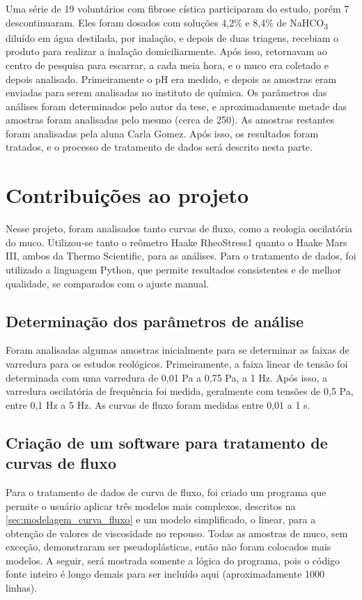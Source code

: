 	Uma série de 19 voluntários com fibrose cística participaram do estudo, porém 7 descontinuaram. Eles foram dosados com soluções 4,2\% e 8,4\% de NaHCO\textsubscript{3} diluído em água destilada, por inalação, e depois de duas triagens, recebiam o produto para realizar a inalação domiciliarmente. Após isso, retornavam ao centro de pesquisa para escarrar, a cada meia hora, e o muco era coletado e depois analisado. Primeiramente o pH era medido, e depois as amostras eram enviadas para serem analisadas no instituto de química. Os parâmetros das análises foram determinados pelo autor da tese, e aproximadamente metade das amostras foram analisadas pelo mesmo (cerca de 250). As amostras restantes foram analisadas pela aluna Carla Gomez. Após isso, os resultados foram tratados, e o processo de tratamento de dados será descrito nesta parte.


	\chapter{Contribuições ao projeto}
	
	Nesse projeto, foram analisados tanto curvas de fluxo, como a reologia oscilatória do muco. Utilizou-se tanto o reômetro Haake RheoStress1 quanto o Haake Mars III, ambos da Thermo Scientific, para as análises. Para o tratamento de dados, foi utilizado a linguagem Python, que permite resultados consistentes e de melhor qualidade, se comparados com o ajuste manual.
	
		\section{Determinação dos parâmetros de análise}
		
		Foram analisadas algumas amostras inicialmente para se determinar as faixas de varredura para os estudos reológicos. Primeiramente, a faixa linear de tensão foi determinada com uma varredura de 0,01 Pa a 0,75 Pa, a 1 Hz. Após isso, a varredura oscilatória de frequência foi medida, geralmente com tensões de 0,5 Pa, entre 0,1 Hz a 5 Hz. As curvas de fluxo foram medidas entre 0,01 a 1 s\menosUm.
	
		\section{Criação de um software para tratamento de curvas de fluxo} 
		\label{sec:apn_tratamento_CF}
		Para o tratamento de dados de curva de fluxo, foi criado um programa que permite o usuário aplicar três modelos mais complexos, descritos na \autoref{sec:modelagem_curva_fluxo} e um modelo simplificado, o linear, para a obtenção de valores de viscosidade no repouso. Todas as amostras de muco, sem exceção, demonstraram ser pseudoplásticas, então não foram colocados mais modelos. A seguir, será mostrada somente a lógica do programa, pois o código fonte inteiro é longo demais para ser incluído aqui (aproximadamente 1000 linhas).
		
